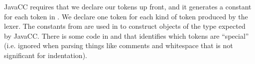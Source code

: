 \documentclass{article}
\begin{document}
\begin{mdP}[class={indent},data-line={132}]%
{}JavaCC requires that we declare our tokens up front, and it generates
a constant for each token in %
{}%
{}.  We declare
one token for each kind of token produced by the lexer.  The
constants from %
{}%
{} are used in %
{}%
{} to
construct %
{}%
{} objects of the type expected by JavaCC.  There is
some code in %
{}%
{} and %
{}%
{} that identifies
which tokens are %
{}{\textquotedblleft}special{\textquotedblright}%
{} (i.e. ignored when parsing%
{}{\textendash}%
{}things like
comments and whitespace that is not significant for indentation).%
\end{mdP}%
\end{document}
